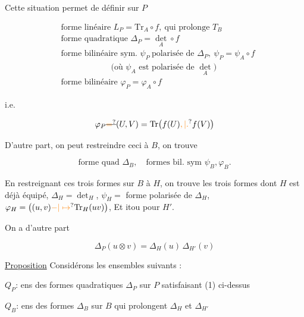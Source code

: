 

Cette situation permet de définir
sur $P$

\[
\begin{aligned}
&\text{forme linéaire }L_P=\mathrm{Tr}_A\circ f,\ \text{qui prolonge }T_B\\
&\text{forme quadratique }\Delta_P=\det_A\circ f\\
&\text{forme bilinéaire sym. }\psi_P\ \text{polarisée de }\Delta_P,\ \psi_P=\psi_A\circ f\\
&\hspace{6em}\text{(où }\psi_A\text{ est polarisée de }\det_A\text{)}\\
&\text{forme bilinéaire }\varphi_P=\varphi_A\circ f
\end{aligned}
\]

i.e.

\[
\varphi_P\deleted{\unsure{=}}(U,V)=\mathrm{Tr}\bigl(f(U)\unsure{,|.}f(V)\bigr)
\]


D'autre part, on peut restreindre ceci
à $B$, on trouve

\[
\text{forme quad }\Delta_B,\quad\text{formes bil. sym }\psi_B,\varphi_B.
\]

En restreignant ces trois formes sur
$B$ à $H$, on trouve les trois formes
dont $H$ est déjà équipé, $\Delta_H=\det_H$, $\psi_H=$ forme
polarisée de $\Delta_H$, $\varphi_H=\bigl((u,v)\unsure{-|\mapsto}\mathrm{Tr}_H(uv)\bigr)$, Et
itou pour $H'$.

On a d'autre part

\[
\Delta_P(u\otimes v)=\Delta_H(u)\,\Delta_{H'}(v) \tag*{(1)}
\]

\uline{Proposition}  Considérons les   ensembles
suivants :

$Q_P$:  ens des formes quadratiques $\Delta_P$ sur $P$ satisfaisant
(1) ci-dessus

$Q_B$:  ens des formes   $\Delta_B$ sur $B$ qui
prolongent $\Delta_H$ et $\Delta_{H'}$

